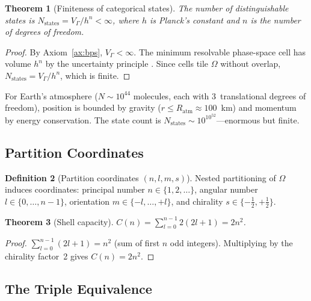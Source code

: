 \documentclass[10pt,twocolumn]{article}
\newtheorem{theorem}{Theorem}[section]
\theoremstyle{definition}
\newtheorem{definition}[theorem]{Definition}
\theoremstyle{remark}
\begin{document}
\begin{theorem}[Finiteness of categorical states]
\label{thm:finite}
The number of distinguishable states is
$N_{\mathrm{states}} = V_\Gamma/h^n < \infty$,
where $h$ is Planck's constant and $n$ is the number of
degrees of freedom.
\end{theorem}

\begin{proof}
By Axiom~\ref{ax:bps}, $V_\Gamma<\infty$.  The minimum
resolvable phase-space cell has volume $h^n$ by the
uncertainty principle \citep{Heisenberg1927}.  Since cells
tile $\Omega$ without overlap, $N_{\mathrm{states}} =
V_\Gamma/h^n$, which is finite.
\end{proof}

For Earth's atmosphere ($N\sim 10^{44}$ molecules, each with
3~translational degrees of freedom), position is bounded by
gravity ($r\le R_{\mathrm{atm}}\approx 100$~km) and momentum
by energy conservation.  The state count is
$N_{\mathrm{states}}\sim 10^{10^{52}}$---enormous but finite.

\subsection{Partition Coordinates}\label{sec:partition}

\begin{definition}[Partition coordinates $(n,l,m,s)$]
\label{def:coords}
Nested partitioning of $\Omega$ induces coordinates: principal
number $n\in\{1,2,\ldots\}$, angular number
$l\in\{0,\ldots,n{-}1\}$, orientation
$m\in\{-l,\ldots,+l\}$, and chirality
$s\in\{-\tfrac{1}{2},+\tfrac{1}{2}\}$.
\end{definition}

\begin{theorem}[Shell capacity]\label{thm:shell}
$C(n) = \sum_{l=0}^{n-1}2(2l+1) = 2n^2$.
\end{theorem}

\begin{proof}
$\sum_{l=0}^{n-1}(2l+1) = n^2$ (sum of first $n$ odd
integers).  Multiplying by the chirality factor~2 gives
$C(n)=2n^2$.
\end{proof}

\subsection{The Triple Equivalence}\label{sec:triple}
\end{document}
